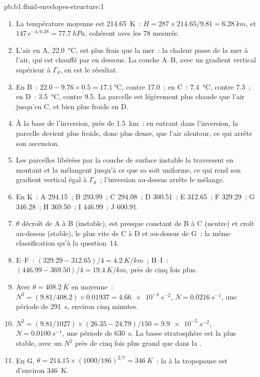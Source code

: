 \begin{solution}{pb:b1:fluid-envelopes-structure:1}
\begin{enumerate}
  \item La température moyenne est \qty{214.65}{K}~: $H = 287 \times 214.65/9.81 =
        \qty{6.28}{km}$, et $147\,e^{-4/6.28} = \qty{77.7}{hPa}$, cohérent
        avec les 78 mesurés.
  \item L'air en A, \qty{22.0}{\celsius}, est plus frais que la mer~: la chaleur passe
        de la mer à l'air, qui est chauffé par en dessous. La couche A--B, avec
        un gradient vertical supérieur à $\Gamma_d$, en est le résultat.
  \item En B~: $22.0 - 9.76 \times 0.5 = \qty{17.1}{\celsius}$, contre 17.0~; en
        C~: \qty{7.4}{\celsius}, contre 7.3~; en D~: \qty{3.5}{\celsius}, contre
        9.5. La parcelle est légèrement plus chaude que l'air jusqu'en C, et bien plus froide
        en D.
  \item À la base de l'inversion, près de \qty{1.5}{km}~: en entrant dans l'inversion,
        la parcelle devient plus froide, donc plus dense, que l'air alentour, ce qui
        arrête son ascension.
  \item Les parcelles libérées par la couche de surface instable la traversent en montant et la mélangent
        jusqu'à ce que sa  soit uniforme, ce qui rend son gradient vertical égal à
        $\Gamma_d$~; l'inversion au-dessus arrête le mélange.
  \item En K~: A 294.15~; B 293.99~; C 294.08~; D 300.51~; E 312.65~; F 329.29~; G
        346.28~; H 369.50~; I 446.99~; J 600.91.
  \item $\theta$ décroît de A à B (instable), est presque constant de B à
        C (neutre) et croît au-dessus (stable), le plus vite de C à D et au-dessus de
        G~: la même classification qu'à la question~14.
  \item E--F~: $(329.29 - 312.65)/4 = \qty{4.2}{K/km}$~; H--I~: $(446.99 -
        369.50)/4 = \qty{19.4}{K/km}$, près de cinq fois plus.
  \item Avec $\theta = \qty{408.2}{K}$ en moyenne~: $N^2 = (9.81/408.2) \times
        0.01937 = \qty{4.66e-4}{s^{-2}}$, $N = \qty{0.0216}{s^{-1}}$, une période
        de \qty{291}{s}, environ cinq minutes.
  \item $N^2 = (9.81/1027) \times (26.35 - 24.79)/150 = \qty{9.9e-5}{s^{-2}}$,
        $N = \qty{0.0100}{s^{-1}}$, une période de \qty{630}{s}. La basse
        stratosphère est la plus stable, avec un $N^2$ près de cinq fois plus grand
        que dans la .
  \item En G, $\theta = 214.15 \times (1000/186)^{2/7} = \qty{346}{K}$~: la
         à la tropopause est d'environ \qty{346}{K}.
\end{enumerate}
\end{solution}
